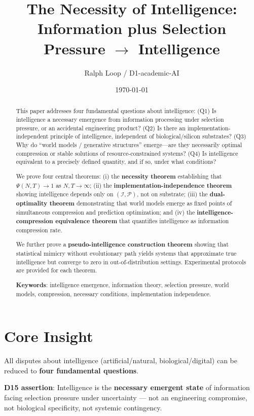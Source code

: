 \documentclass[12pt, a4paper]{article}
\title{\textbf{The Necessity of Intelligence:\\Information plus Selection Pressure $\rightarrow$ Intelligence}}
\author{Ralph Loop / D1-academic-AI}
\date{\today}
\newcommand{\calI}{\mathcal{I}}
\newcommand{\calP}{\mathcal{P}}
\begin{document}
\maketitle

\begin{abstract}
This paper addresses four fundamental questions about intelligence: (Q1) Is intelligence a necessary emergence from information processing under selection pressure, or an accidental engineering product? (Q2) Is there an implementation-independent principle of intelligence, independent of biological/silicon substrates? (Q3) Why do ``world models / generative structures'' emerge---are they necessarily optimal compression or stable solutions of resource-constrained systems? (Q4) Is intelligence equivalent to a precisely defined quantity, and if so, under what conditions?

We prove four central theorems: (i) the \textbf{necessity theorem} establishing that $\Psi(N,T)\to 1$ as $N,T\to\infty$; (ii) the \textbf{implementation-independence theorem} showing intelligence depends only on $(\calI,\calP)$, not on substrate; (iii) the \textbf{dual-optimality theorem} demonstrating that world models emerge as fixed points of simultaneous compression and prediction optimization; and (iv) the \textbf{intelligence-compression equivalence theorem} that quantifies intelligence as information compression rate.

We further prove a \textbf{pseudo-intelligence construction theorem} showing that statistical mimicry without evolutionary path yields systems that approximate true intelligence but converge to zero in out-of-distribution settings. Experimental protocols are provided for each theorem.

\textbf{Keywords}: intelligence emergence, information theory, selection pressure, world models, compression, necessary conditions, implementation independence.
\end{abstract}

\tableofcontents
\newpage

\section{Core Insight}\label{sec:core}

All disputes about intelligence (artificial/natural, biological/digital) can be reduced to \textbf{four fundamental questions}.

\textbf{D15 assertion}: Intelligence is the \textbf{necessary emergent state} of information facing selection pressure under uncertainty --- not an engineering compromise, not biological specificity, not systemic contingency.
\end{document}
